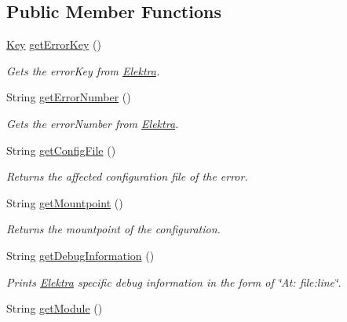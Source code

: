 \subsection*{Public Member Functions}
\begin{DoxyCompactItemize}
\item 
\hyperlink{classorg_1_1libelektra_1_1Key}{Key} \hyperlink{classorg_1_1libelektra_1_1exception_1_1KDBException_a8fd8c0decfe1f1f6243407614d042101}{get\+Error\+Key} ()
\begin{DoxyCompactList}\small\item\em Gets the error\+Key from \hyperlink{interfaceorg_1_1libelektra_1_1Elektra}{Elektra}. \end{DoxyCompactList}\item 
String \hyperlink{classorg_1_1libelektra_1_1exception_1_1KDBException_a3d07f27121a4870471ea6927d93c04a9}{get\+Error\+Number} ()
\begin{DoxyCompactList}\small\item\em Gets the error\+Number from \hyperlink{interfaceorg_1_1libelektra_1_1Elektra}{Elektra}. \end{DoxyCompactList}\item 
String \hyperlink{classorg_1_1libelektra_1_1exception_1_1KDBException_ad963bf071d65028200f13f18bc355472}{get\+Config\+File} ()
\begin{DoxyCompactList}\small\item\em Returns the affected configuration file of the error. \end{DoxyCompactList}\item 
String \hyperlink{classorg_1_1libelektra_1_1exception_1_1KDBException_a7595349ac675e5b57616020d512b82d2}{get\+Mountpoint} ()
\begin{DoxyCompactList}\small\item\em Returns the mountpoint of the configuration. \end{DoxyCompactList}\item 
String \hyperlink{classorg_1_1libelektra_1_1exception_1_1KDBException_ad43f4032095b1bfa1dc5065c5e01f9bb}{get\+Debug\+Information} ()
\begin{DoxyCompactList}\small\item\em Prints \hyperlink{interfaceorg_1_1libelektra_1_1Elektra}{Elektra} specific debug information in the form of \char`\"{}\+At\+: file\+:line\char`\"{}. \end{DoxyCompactList}\item 
String \hyperlink{classorg_1_1libelektra_1_1exception_1_1KDBException_a241bb6bc3b93677bc4b51d23b917f9d1}{get\+Module} ()

\end{DoxyCompactItemize}
